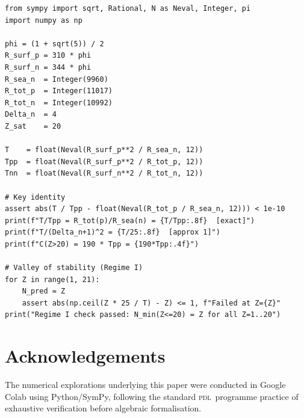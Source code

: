 \documentclass{article}
\theoremstyle{remark}
\newcommand{\PDL}{\textsc{pdl}}
\begin{document}
\begin{verbatim}
from sympy import sqrt, Rational, N as Neval, Integer, pi
import numpy as np

phi = (1 + sqrt(5)) / 2
R_surf_p = 310 * phi
R_surf_n = 344 * phi
R_sea_n  = Integer(9960)
R_tot_p  = Integer(11017)
R_tot_n  = Integer(10992)
Delta_n  = 4
Z_sat    = 20

T    = float(Neval(R_surf_p**2 / R_sea_n, 12))
Tpp  = float(Neval(R_surf_p**2 / R_tot_p, 12))
Tnn  = float(Neval(R_surf_n**2 / R_tot_n, 12))

# Key identity
assert abs(T / Tpp - float(Neval(R_tot_p / R_sea_n, 12))) < 1e-10
print(f"T/Tpp = R_tot(p)/R_sea(n) = {T/Tpp:.8f}  [exact]")
print(f"T/(Delta_n+1)^2 = {T/25:.8f}  [approx 1]")
print(f"C(Z>20) = 190 * Tpp = {190*Tpp:.4f}")

# Valley of stability (Regime I)
for Z in range(1, 21):
    N_pred = Z
    assert abs(np.ceil(Z * 25 / T) - Z) <= 1, f"Failed at Z={Z}"
print("Regime I check passed: N_min(Z<=20) = Z for all Z=1..20")
\end{verbatim}

\section*{Acknowledgements}

The numerical explorations underlying this paper were conducted in Google Colab using Python/SymPy, following the standard \PDL\ programme practice of exhaustive verification before algebraic formalisation.



\end{document}

